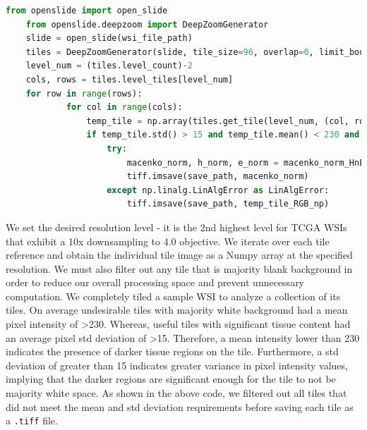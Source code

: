 \documentclass{l4proj}
\begin{document}
\begin{lstlisting}[language=python, caption={Code excerpt showing how OpenSlide and DeepZoomGenerator are used to obtain tiles of specified dimension and resolution level from an input WSI image and saming them as a .tiff image. We also added a modification to normalize each tile (explained in the next section) before saving. It calls \texttt{macenko\_norm\_HnE()} on each tile's numpy array and saves the normalized image. We also catch any SVD convergence errors thrown by tiles that have large areas of white space. This is the case for external tiles containing debris outside the main body of tissue.}, label= lst:tiling-code]
    from openslide import open_slide
    from openslide.deepzoom import DeepZoomGenerator
    slide = open_slide(wsi_file_path)
    tiles = DeepZoomGenerator(slide, tile_size=96, overlap=0, limit_bounds=False)
    level_num = (tiles.level_count)-2
    cols, rows = tiles.level_tiles[level_num]
    for row in range(rows):
            for col in range(cols):
                temp_tile = np.array(tiles.get_tile(level_num, (col, row)).convert('RGB'))
                if temp_tile.std() > 15 and temp_tile.mean() < 230 and temp_tile.shape == (96,96,3):
                    try:
                        macenko_norm, h_norm, e_norm = macenko_norm_HnE(temp_tile)
                        tiff.imsave(save_path, macenko_norm)
                    except np.linalg.LinAlgError as LinAlgError:
                        tiff.imsave(save_path, temp_tile_RGB_np)
\end{lstlisting}

We set the desired resolution level - it is the 2nd highest level for TCGA WSIs that exhibit a 10x downsampling to 4.0 objective. We iterate over each tile reference and obtain the individual tile image as a Numpy array at the specified resolution. We must also filter out any tile that is majority blank background in order to reduce our overall processing space and prevent unnecessary computation. We completely tiled a sample WSI to analyze a collection of its tiles. On average undesirable tiles with majority white background had a mean pixel intensity of >230. Whereas, useful tiles with significant tissue content had an average pixel std deviation of >15. Therefore, a mean intensity lower than 230 indicates the presence of darker tissue regions on the tile. Furthermore, a std deviation of greater than 15 indicates greater variance in pixel intensity values, implying that the darker regions are significant enough for the tile to not be majority white space. As shown in the above code, we filtered out all tiles that did not meet the mean and std deviation requirements before saving each tile as a \texttt{.tiff} file.
\\
\end{document}
